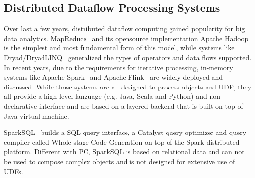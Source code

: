 \subsection{Distributed Dataflow Processing Systems}
Over last a few years, distributed dataflow computing gained
popularity for big
data analytics. MapReduce~\cite {dean2008mapreduce} and its opensource
implementation Apache Hadoop~\cite{white2009hadoop} is the simplest and
most fundamental form of this model, while systems like
Dryad/DryadLINQ~\cite{yu2008dryadlinq} generalized the types of operators and
data flows supported. In recent years, due to the requirements for
iterative processing, in-memory systems like
Apache Spark~\cite{zaharia2012resilient} and
Apache Flink~\cite{alexandrov2014stratosphere} are widely deployed and
discussed. While those systems are all designed to process objects and
UDF, they all provide a high-level language
(e.g. Java, Scala and Python) and non-declarative interface and are
based on a layered backend that is built on top of Java virtual machine.

SparkSQL~\cite{armbrust2015spark} builds a SQL query
interface, a Catalyst query optimizer and query compiler called Whole-stage Code Generation
on top of the Spark distributed platform. Different with PC, SparkSQL
is based on relational data and can not be used to compose complex
objects and is not designed for extensive use of UDFs.





